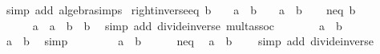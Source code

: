 \begin{isabellebody}
%
\isadelimproof
%
\endisadelimproof
%
\isatagproof
{}\isamarkupfalse%
\ {\isacharparenleft}{\kern0pt}simp\ add{\isacharcolon}{\kern0pt}\ algebra{\isacharunderscore}{\kern0pt}simps{\isacharparenright}{\kern0pt}%
\endisatagproof
{\isafoldproof}%
%
\isadelimproof
\isanewline
%
\endisadelimproof
\isanewline
{}\isamarkupfalse%
\ right{\isacharunderscore}{\kern0pt}inverse{\isacharunderscore}{\kern0pt}eq{\isacharcolon}{\kern0pt}\ {\isachardoublequoteopen}b\ {\isasymnoteq}\ {}\ {\isasymLongrightarrow}\ a\ {\isacharslash}{\kern0pt}\ b\ {\isacharequal}{\kern0pt}\ {}\ {\isasymlongleftrightarrow}\ a\ {\isacharequal}{\kern0pt}\ b{\isachardoublequoteclose}\isanewline
%
\isadelimproof
%
\endisadelimproof
%
\isatagproof
{}\isamarkupfalse%
\isanewline
\ \ \isamarkupfalse%
\ neq{\isacharcolon}{\kern0pt}\ {\isachardoublequoteopen}b\ {\isasymnoteq}\ {}{\isachardoublequoteclose}\isanewline
\ \ \isacommand{{\isacharbraceleft}{\kern0pt}}\isamarkupfalse%
\isanewline
\ \ \ \ \isamarkupfalse%
\ {\isachardoublequoteopen}a\ {\isacharequal}{\kern0pt}\ {\isacharparenleft}{\kern0pt}a\ {\isacharslash}{\kern0pt}\ b{\isacharparenright}{\kern0pt}\ {\isacharasterisk}{\kern0pt}\ b{\isachardoublequoteclose}\ \isamarkupfalse%
\ {\isacharparenleft}{\kern0pt}simp\ add{\isacharcolon}{\kern0pt}\ divide{\isacharunderscore}{\kern0pt}inverse\ mult{\isachardot}{\kern0pt}assoc{\isacharparenright}{\kern0pt}\isanewline
\ \ \ \ \isamarkupfalse%
\ \isamarkupfalse%
\ {\isachardoublequoteopen}a\ {\isacharslash}{\kern0pt}\ b\ {\isacharequal}{\kern0pt}\ {}{\isachardoublequoteclose}\isanewline
\ \ \ \ \isamarkupfalse%
\ \isamarkupfalse%
\ {\isachardoublequoteopen}a\ {\isacharequal}{\kern0pt}\ b{\isachardoublequoteclose}\ \isamarkupfalse%
\ simp\isanewline
\ \ \isamarkupfalse%
\isanewline
\ \ \ \ \isamarkupfalse%
\ {\isachardoublequoteopen}a\ {\isacharequal}{\kern0pt}\ b{\isachardoublequoteclose}\isanewline
\ \ \ \ \isamarkupfalse%
\ neq\ \isamarkupfalse%
\ {\isachardoublequoteopen}a\ {\isacharslash}{\kern0pt}\ b\ {\isacharequal}{\kern0pt}\ {}{\isachardoublequoteclose}\ \isamarkupfalse%
\ {\isacharparenleft}{\kern0pt}simp\ add{\isacharcolon}{\kern0pt}\ divide{\isacharunderscore}{\kern0pt}inverse{\isacharparenright}{\kern0pt}\isanewline
\ \ \isacommand{{\isacharbraceright}{\kern0pt}}\isamarkupfalse%

\end{isabellebody}
